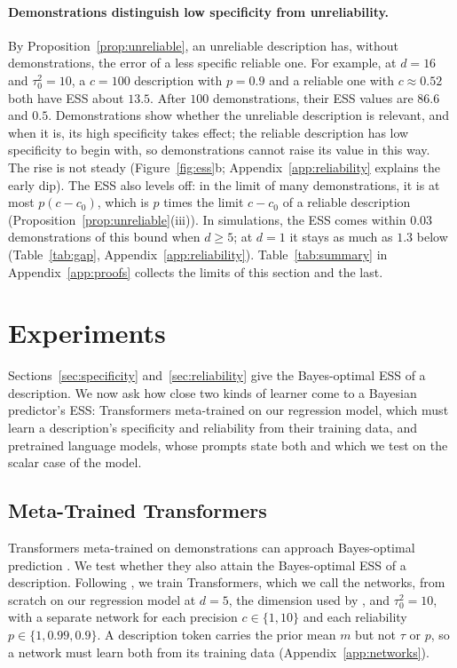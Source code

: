 \documentclass{article}
\theoremstyle{definition}
\begin{document}
\paragraph{Demonstrations distinguish low specificity from unreliability.}
By Proposition~\ref{prop:unreliable}, an unreliable description has, without demonstrations, the error of a less specific reliable one. For example, at $d=16$ and $\tau_0^2=10$, a $c=100$ description with $p=0.9$ and a reliable one with $c\approx0.52$ both have ESS about $13.5$. After $100$ demonstrations, their ESS values are $86.6$ and $0.5$. Demonstrations show whether the unreliable description is relevant, and when it is, its high specificity takes effect; the reliable description has low specificity to begin with, so demonstrations cannot raise its value in this way. The rise is not steady (Figure~\ref{fig:ess}b; Appendix~\ref{app:reliability} explains the early dip). The ESS also levels off: in the limit of many demonstrations, it is at most $p(c-c_0)$, which is $p$ times the limit $c-c_0$ of a reliable description (Proposition~\ref{prop:unreliable}(iii)). In simulations, the ESS comes within $0.03$ demonstrations of this bound when $d\geq5$; at $d=1$ it stays as much as $1.3$ below (Table~\ref{tab:gap}, Appendix~\ref{app:reliability}). Table~\ref{tab:summary} in Appendix~\ref{app:proofs} collects the limits of this section and the last.

\section{Experiments}\label{sec:experiments}

Sections~\ref{sec:specificity} and~\ref{sec:reliability} give the Bayes-optimal ESS of a description. We now ask how close two kinds of learner come to a Bayesian predictor's ESS: Transformers meta-trained on our regression model, which must learn a description's specificity and reliability from their training data, and pretrained language models, whose prompts state both and which we test on the scalar case of the model.

\subsection{Meta-Trained Transformers}\label{sec:networks}

Transformers meta-trained on demonstrations can approach Bayes-optimal prediction \citep{garg2022,genewein2025}. We test whether they also attain the Bayes-optimal ESS of a description. Following \citet{garg2022}, we train Transformers, which we call the networks, from scratch on our regression model at $d=5$, the dimension used by \citet{huangge2025}, and $\tau_0^2=10$, with a separate network for each precision $c\in\{1,10\}$ and each reliability $p\in\{1,0.99,0.9\}$. A description token carries the prior mean $m$ but not $\tau$ or $p$, so a network must learn both from its training data (Appendix~\ref{app:networks}).
\end{document}
